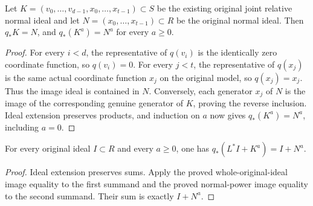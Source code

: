 \begin{theorem}
\label{hir:tangent-displacement-zero-normal-ideal}
\leanok
Let $K=(v_0,\ldots,v_{d-1},x_0,\ldots,x_{t-1})\subset S$ be
the existing original joint relative normal ideal and let
$N=(x_0,\ldots,x_{t-1})\subset R$ be the original normal ideal.
Then $q_*K=N$, and $q_*(K^a)=N^a$ for every $a\geq0$.
\end{theorem}
\begin{proof}
For every $i<d$, the representative of $q(v_i)$ is the identically
zero coordinate function, so $q(v_i)=0$. For every $j<t$, the
representative of $q(x_j)$ is the same actual coordinate function
$x_j$ on the original model, so $q(x_j)=x_j$. Thus the image ideal
is contained in $N$. Conversely, each generator $x_j$ of $N$ is the
image of the corresponding genuine generator of $K$, proving the
reverse inclusion. Ideal extension preserves products, and induction
on $a$ now gives $q_*(K^a)=N^a$, including $a=0$.
\end{proof}

\begin{corollary}
\label{hir:tangent-displacement-zero-truncated-ideal}
\leanok
For every original ideal $I\subset R$ and every $a\geq0$, one has
$q_*(L^*I+K^a)=I+N^a$.
\end{corollary}
\begin{proof}
Ideal extension preserves sums. Apply the proved whole-original-ideal
image equality to the first summand and the proved normal-power image
equality to the second summand. Their sum is exactly $I+N^a$.
\end{proof}

